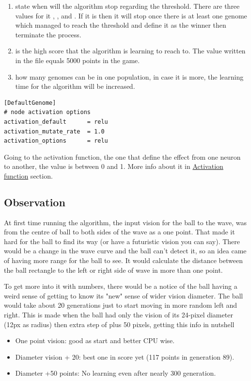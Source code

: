 \begin{enumerate}
\item {} state when will the algorithm stop regarding the threshold. There are three values for it , , and . If it is  then it will stop once there is at least one genome which managed to reach the threshold and define it as the winner then terminate the process.

\item {} is the high score that the algorithm is learning to reach to. The value written in the file equals 5000 points in the game.

\item {} how many genomes can be in one population, in case it is more, the learning time for the algorithm will be increased.

\end{enumerate}

\begin{listing}[H]
\begin{verbatim}
[DefaultGenome]
# node activation options
activation_default      = relu
activation_mutate_rate  = 1.0
activation_options      = relu
\end{verbatim}
\end{listing}

Going to the activation function, the one that define the effect from one neuron to another, the value is between 0 and 1. More info about it in \hyperref[sec:activation-function]{Activation function} section.  



\subsection{Observation}\label{Observation}
At first time running the algorithm, the input vision for the ball to the wave, was from the centre of ball to both sides of the wave as a one point. That made it hard for the ball to find its way (or have a futuristic vision you can say). There would be a change in the wave curve and the ball can't detect it, so an idea came of having more range for the ball to see. It would calculate the distance between the ball rectangle to the left or right side of wave in more than one point.

To get more into it with numbers, there would be a notice of the ball having a weird sense of getting to know its "new" sense of wider vision diameter. The ball would take about 20 generations just to start moving in more random left and right. This is made when the ball had only the vision of its 24-pixel diameter (12px as radius) then extra step of plus 50 pixels, getting this info in nutshell
\begin{itemize}
\item One point vision: good as start and better CPU wise.
\item Diameter vision + 20: best one in score yet (117 points in generation 89).
\item Diameter +50 points: No learning even after nearly 300 generation.
\end{itemize}

